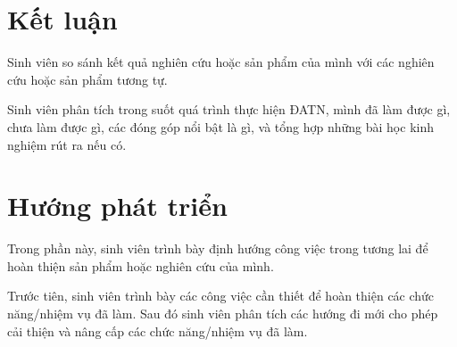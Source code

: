 \documentclass[../LuanVan.tex]{subfiles}
\begin{document}
\section{Kết luận}
Sinh viên so sánh kết quả nghiên cứu hoặc sản phẩm của mình với các nghiên cứu hoặc sản phẩm tương tự.

Sinh viên phân tích trong suốt quá trình thực hiện ĐATN, mình đã làm được gì, chưa làm được gì, các đóng góp nổi bật là gì, và tổng hợp những bài học kinh nghiệm rút ra nếu có.

\section{Hướng phát triển}
Trong phần này, sinh viên trình bày định hướng công việc trong tương lai để hoàn thiện sản phẩm hoặc nghiên cứu của mình.

Trước tiên, sinh viên trình bày các công việc cần thiết để hoàn thiện các chức năng/nhiệm vụ đã làm. Sau đó sinh viên phân tích các hướng đi mới cho phép cải thiện và nâng cấp các chức năng/nhiệm vụ đã làm.
\end{document}
